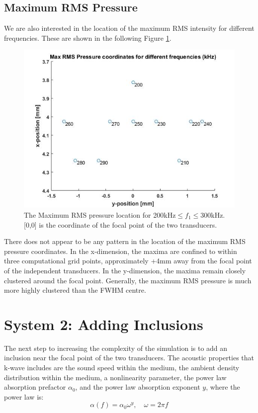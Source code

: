 \documentclass[10pt,a4paper]{article}
\begin{document}
\subsection*{Maximum RMS Pressure}

We are also interested in the location of the maximum RMS intensity for different frequencies. These are shown in the following Figure \ref{RMS_Max}. 

\begin{figure}[H] \label{RMS_Max}
\centering
\includegraphics[scale=0.65]{Max_RMS_pressure_coords}
\caption{The Maximum RMS pressure location for 200kHz$\leq f_1 \leq$300kHz.  [0,0] is the coordinate of the focal point of the two transducers. } 
\end{figure}

There does not appear to be any pattern in the location of the maximum RMS pressure coordinates. In the x-dimension, the maxima are confined to within three computational grid points, approximately +4mm away from the focal point of the independent transducers. In the y-dimension, the maxima remain closely clustered around the focal point. Generally, the maximum RMS pressure is much more highly clustered than the FWHM centre.

\section*{System 2: Adding Inclusions}

The next step to increasing the complexity of the simulation is to add an inclusion near the focal point of the two transducers. The acoustic properties that k-wave includes are the sound speed within the medium, the ambient density distribution within the medium, a nonlinearity parameter, the power law absorption prefactor $\alpha_0$, and the power law absorption exponent $y$, where the power law is:
\begin{equation}
\alpha(f) = \alpha_0 \omega^y, 	\quad \omega = 2 \pi f 
\end{equation}
\end{document}
